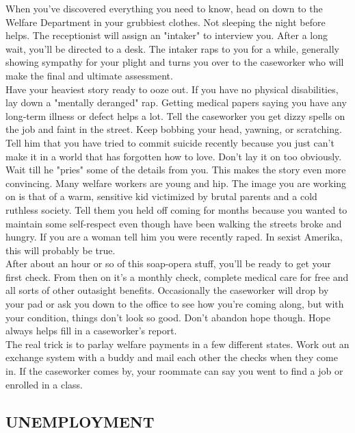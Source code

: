 \documentclass[11pt,twoside,a4paper]{book}
\begin{document}
When you've discovered everything you need to know, head on down to the Welfare Department in your grubbiest clothes. Not sleeping the night before helps. The receptionist will assign an "intaker" to interview you. After a long wait, you'll be directed to a desk. The intaker raps to you for a while, generally showing sympathy for your plight and turns you over to the caseworker who will make the final and ultimate assessment.~\\

Have your heaviest story ready to ooze out. If you have no physical disabilities, lay down a "mentally deranged" rap. Getting medical papers saying you have any long-term illness or defect helps a lot. Tell the caseworker you get dizzy spells on the job and faint in the street. Keep bobbing your head, yawning, or scratching. Tell him that you have tried to commit suicide recently because you just can't make it in a world that has forgotten how to love. Don't lay it on too obviously. Wait till he "pries" some of the details from you. This makes the story even more convincing. Many welfare workers are young and hip. The image you are working on is that of a warm, sensitive kid victimized by brutal parents and a cold ruthless society. Tell them you held off coming for months because you wanted to maintain some self-respect even though have been walking the streets broke and hungry. If you are a woman tell him you were recently raped. In sexist Amerika, this will probably be true.~\\

After about an hour or so of this soap-opera stuff, you'll be ready to get your first check. From then on it's a monthly check, complete medical care for free and all sorts of other outasight benefits. Occasionally the caseworker will drop by your pad or ask you down to the office to see how you're coming along, but with your condition, things don't look so good. Don't abandon hope though. Hope always helps fill in a caseworker's report.~\\

The real trick is to parlay welfare payments in a few different states. Work out an exchange system with a buddy and mail each other the checks when they come in. If the caseworker comes by, your roommate can say you went to find a job or enrolled in a class. %

\subsection{UNEMPLOYMENT}
\end{document}
